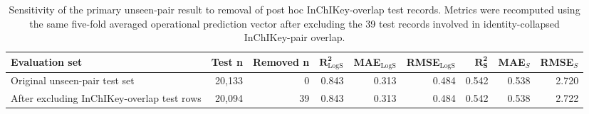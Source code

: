 \begin{table}[htbp]
\centering
\small
\caption{Sensitivity of the primary unseen-pair result to removal of post hoc InChIKey-overlap test records. Metrics were recomputed using the same five-fold averaged operational prediction vector after excluding the 39 test records involved in identity-collapsed InChIKey-pair overlap.}
\label{tab:supp_inchikey_sensitivity}
\renewcommand{\arraystretch}{1.15}
\setlength{\tabcolsep}{5pt}
\begin{tabular}{lrrrrrrrr}
\toprule
\textbf{Evaluation set}
& \textbf{Test n}
& \textbf{Removed n}
& $\mathbf{R^2_{\mathrm{LogS}}}$
& \textbf{MAE$_{\mathrm{LogS}}$}
& \textbf{RMSE$_{\mathrm{LogS}}$}
& $\mathbf{R^2_{S}}$
& \textbf{MAE$_S$}
& \textbf{RMSE$_S$} \\
\midrule
Original unseen-pair test set & 20,133 & 0 & 0.843 & 0.313 & 0.484 & 0.542 & 0.538 & 2.720 \\
After excluding InChIKey-overlap test rows & 20,094 & 39 & 0.843 & 0.313 & 0.484 & 0.542 & 0.538 & 2.722 \\
\bottomrule
\end{tabular}
\end{table}
